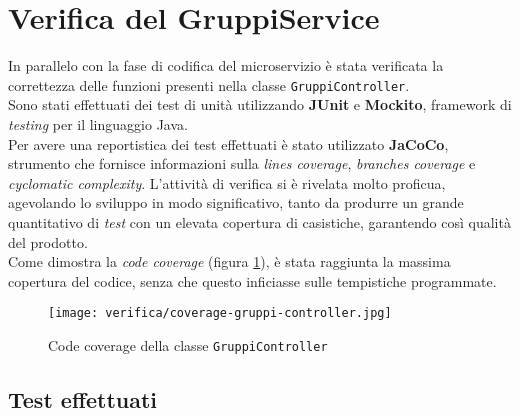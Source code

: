 \section{Verifica del GruppiService}
In parallelo con la fase di codifica del \gls{microservizio}
 è stata verificata la correttezza delle funzioni
presenti nella classe \texttt{GruppiController}. \\
Sono stati effettuati dei test di unità utilizzando \textbf{JUnit} e
\textbf{Mockito}, \gls{framework} di \textit{testing} per il linguaggio Java.\\
Per avere una reportistica dei test effettuati è stato utilizzato
\textbf{JaCoCo}, strumento che fornisce informazioni sulla \textit{lines
      coverage}, \textit{branches coverage} e \textit{cyclomatic complexity}.
L'attività di verifica si è rivelata molto proficua, agevolando lo sviluppo in
modo significativo, tanto da produrre un grande quantitativo di \textit{test}
con un elevata copertura di casistiche, garantendo così qualità del prodotto.\\
Come dimostra la \textit{code coverage} (figura \ref{img:code-coverage}), è
stata raggiunta la massima copertura del codice, senza che questo inficiasse
sulle tempistiche programmate.

\begin{figure}[H]

      \centerline{\texttt{[image: verifica/coverage-gruppi-controller.jpg]}}

      \caption{Code coverage della classe \texttt{GruppiController}}
      \label{img:code-coverage}
\end{figure}

\subsection{Test effettuati}



